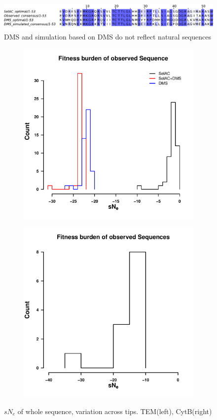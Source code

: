 \documentclass[12pt]{article}
\begin{document}
\begin{figure}[H]
     \centering
	\includegraphics[width=\textwidth]{img/seq_simil_short.pdf}
	\caption{DMS and simulation based on DMS do not reflect natural sequences}
	\label{fig:sim_seqs_cons}
\end{figure}

\begin{figure}[h]
    \centering
    \begin{subfigure}
        \centering
        \includegraphics[width=.45\textwidth]{img/sNe_TEM2016.pdf}
    \end{subfigure}
    \begin{subfigure}
        \centering
        \includegraphics[width=.45\textwidth]{img/sNe_whale.pdf}
    \end{subfigure}
    \caption{$sN_e$ of whole sequence, variation across tips. TEM(left), CytB(right)}
    \label{fig:dms_sim}
\end{figure}
\end{document}
